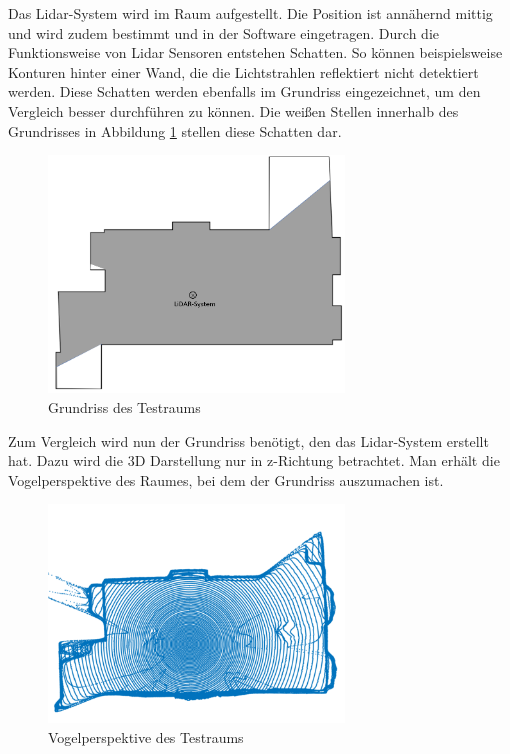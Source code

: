 Das Lidar-System wird im Raum aufgestellt. Die Position ist annähernd mittig und wird zudem bestimmt und in der Software eingetragen. Durch die Funktionsweise von Lidar Sensoren entstehen Schatten. So können beispielsweise Konturen hinter einer Wand, die die Lichtstrahlen reflektiert nicht detektiert werden. Diese Schatten werden ebenfalls im Grundriss eingezeichnet, um den Vergleich besser durchführen zu können. Die weißen Stellen innerhalb des Grundrisses in Abbildung \ref{grundrssmitschatte} stellen diese Schatten dar.

\begin{figure}[H]
	\centering
	\includegraphics[width=0.7\textwidth]{images/Validierung/MitSchatten}
	\caption{Grundriss des Testraums}
	\label{grundrssmitschatte}
\end{figure}


Zum Vergleich wird nun der Grundriss benötigt, den das Lidar-System erstellt hat. Dazu wird die 3D Darstellung nur in z-Richtung betrachtet. Man erhält die Vogelperspektive des Raumes, bei dem der Grundriss auszumachen ist. 

\begin{figure}[H]
	\centering
	\includegraphics[width=0.7\textwidth]{images/Validierung/Vogelperspektive}
	\caption{Vogelperspektive des Testraums}
	\label{vogelperspektive}
\end{figure}


